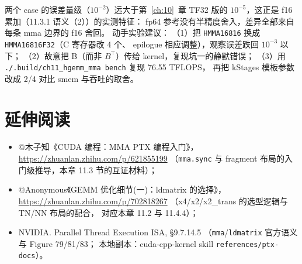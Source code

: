 两个 case 的误差量级（$10^{-2}$）远大于第~\ref{ch:10}~章 TF32 版的
$10^{-5}$，这正是 f16 累加（11.3.1 语义（2））的实测特征：
fp64 参考没有半精度舍入，差异全部来自每条 mma 边界的 f16 舍回。
动手实验建议：
（1）把 \texttt{HMMA16816} 换成 \texttt{HMMA16816\allowbreak{}F32}（C 寄存器改 4 个、
epilogue 相应调整），观察误差跌回 $10^{-3}$ 以下；
（2）故意把 B（而非 $B^{\top}$）传给 kernel，复现坑一的静默错误；
（3）用 \texttt{.\allowbreak{}/\allowbreak{}.\allowbreak{}build/\allowbreak{}ch11\_\allowbreak{}hgemm\_\allowbreak{}mma bench} 复现 76.55 TFLOPS，
再把 kStages 模板参数改成 2/4 对比 smem 与吞吐的取舍。

\section*{延伸阅读}

\begin{itemize}
  \item @木子知《CUDA 编程：MMA PTX 编程入门》，
        \url{https://zhuanlan.zhihu.com/p/621855199}
        （\texttt{mma.sync} 与 fragment 布局的入门级推导，本章
        11.3 节的互证材料）；
  \item @Anonymous《GEMM 优化细节(一)：ldmatrix 的选择》，
        \url{https://zhuanlan.zhihu.com/p/702818267}
        （x4/x2/x2\_trans 的选型逻辑与 TN/NN 布局的配合，
        对应本章 11.2 与 11.4.4）；
  \item NVIDIA. Parallel Thread Execution ISA, §9.7.14.5
        （\texttt{mma}/\texttt{ldmatrix} 官方语义与 Figure 79/81/83；
        本地副本：cuda-cpp-kernel skill \texttt{references/\allowbreak{}ptx-docs}）。
\end{itemize}
